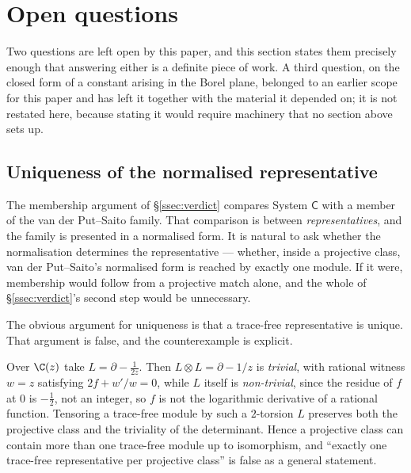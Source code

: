 \section{Open questions}\label{sec:open}

Two questions are left open by this paper, and this section states them
precisely enough that answering either is a definite piece of work. A third
question, on the closed form of a constant arising in the Borel plane, belonged
to an earlier scope for this paper and has left it together with the material
it depended on; it is not restated here, because stating it would require
machinery that no section above sets up.

\subsection{Uniqueness of the normalised representative}\label{ssec:gauge}

The membership argument of \S\ref{ssec:verdict} compares System
$\mathsf C$ with a member of the van der Put--Saito family. That comparison is
between \emph{representatives}, and the family is presented in a normalised
form. It is natural to ask whether the normalisation determines the
representative --- whether, inside a projective class, van der Put--Saito's
normalised form is reached by exactly one module. If it were, membership would
follow from a projective match alone, and the whole of \S\ref{ssec:verdict}'s
second step would be unnecessary.

The obvious argument for uniqueness is that a trace-free representative is
unique. That argument is false, and the counterexample is explicit.

\begin{remark}
Over $\C(z)$ take $L=\partial-\tfrac{1}{2z}$. Then $L\otimes L=\partial-1/z$ is
\emph{trivial}, with rational witness $w=z$ satisfying $2f+w'/w=0$, while $L$
itself is \emph{non-trivial}, since the residue of $f$ at $0$ is $-\tfrac12$,
not an integer, so $f$ is not the logarithmic derivative of a rational
function. Tensoring a trace-free module by such a $2$-torsion $L$ preserves
both the projective class and the triviality of the determinant. Hence a
projective class can contain more than one trace-free module up to isomorphism,
and ``exactly one trace-free representative per projective class'' is false as
a general statement.
\end{remark}

